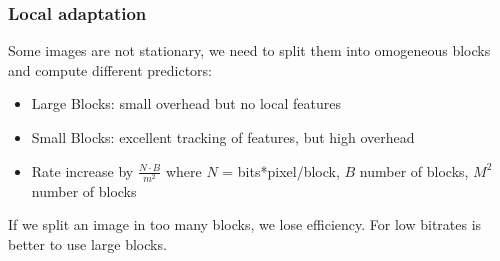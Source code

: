 \subsubsection{Local adaptation}
Some images are not stationary, we need to split them into omogeneous blocks and compute different predictors:
\begin{itemize}
    \item Large Blocks: small overhead but no local features
    \item Small Blocks: excellent tracking of features, but high overhead
    \item Rate increase by $\frac{N\cdot B}{m^2}$ where $N$ = bits*pixel/block, $B$ number of blocks, $M^2$ number of blocks
\end{itemize}
If we split an image in too many blocks, we lose efficiency. For low bitrates is better to use large blocks.
